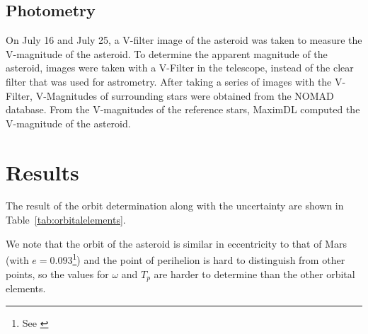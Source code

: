 \documentclass[12pt,journal,compsoc]{IEEEtran}
\begin{document}
\subsection{Photometry}
On July 16 and July 25, a V-filter image of the asteroid was taken to measure the V-magnitude of the asteroid.
To determine the apparent magnitude of the asteroid, images were taken with a V-Filter in the telescope, 
instead of the clear filter that was used for astrometry.
After taking a series of images with the V-Filter, V-Magnitudes of surrounding stars were obtained from the NOMAD database.
From the V-magnitudes of the reference stars, MaximDL computed the V-magnitude of the asteroid.

\begin{table}[!t]
\centering
{}
\caption{V-Magnitude of 1951 Lick \label{tab:vmag}}
\end{table}

\section{Results}

The result of the orbit determination along with the uncertainty are shown in Table~\ref{tab:orbitalelements}.

\begin{table}[!t]
\centering
{}
\caption{Measured orbital elements \label{tab:orbitalelements}}
\end{table}


We note that the orbit of the asteroid is similar in eccentricity to that of Mars (with $e = 0.093$\footnote{See \cite{bib:horizons}}) and the point of perihelion is hard to distinguish from other points, so the values for $\omega$ and $T_p$ are harder to determine than the other orbital elements.
\end{document}
